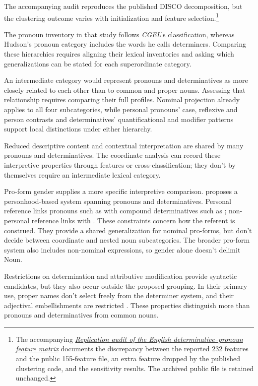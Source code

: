 \documentclass[12pt]{article}
\begin{document}
The accompanying audit reproduces the published DISCO decomposition, but the clustering outcome varies with initialization and feature selection.\footnote{The accompanying \href{run:matrix-audit.pdf}{\textit{Replication audit of the English determinative--pronoun feature matrix}} documents the discrepancy between the reported 232 features and the public 155-feature file, an extra feature dropped by the published clustering code, and the sensitivity results. The archived public file is retained unchanged.}

The pronoun inventory in that study follows \textit{CGEL}'s classification, whereas Hudson's pronoun category includes the words he calls determiners. Comparing these hierarchies requires aligning their lexical inventories and asking which generalizations can be stated for each superordinate category.

An intermediate category would represent pronouns and determinatives as more closely related to each other than to common and proper nouns. Assessing that relationship requires comparing their full profiles. Nominal projection already applies to all four subcategories, while personal pronouns' case, reflexive and person contrasts and determinatives' quantificational and modifier patterns support local distinctions under either hierarchy.

Reduced descriptive content and contextual interpretation are shared by many pronouns and determinatives. The coordinate analysis can record these interpretive properties through features or cross-classification; they don't by themselves require an intermediate lexical category.

Pro-form gender supplies a more specific interpretive comparison. \textcite{reynolds2025proformgender} proposes a personhood-based system spanning pronouns and determinatives. Personal reference links pronouns such as  with compound determinatives such as ; non-personal reference links  with . These constraints concern how the referent is construed. They provide a shared generalization for nominal pro-forms, but don't decide between coordinate and nested noun subcategories. The broader pro-form system also includes non-nominal expressions, so gender alone doesn't delimit Noun.

Restrictions on determination and attributive modification provide syntactic candidates, but they also occur outside the proposed grouping. In their primary use, proper names don't select freely from the determiner system, and their adjectival embellishments are restricted \citep[517, 519--520]{huddleston2002}. These properties distinguish more than pronouns and determinatives from common nouns.
\end{document}
